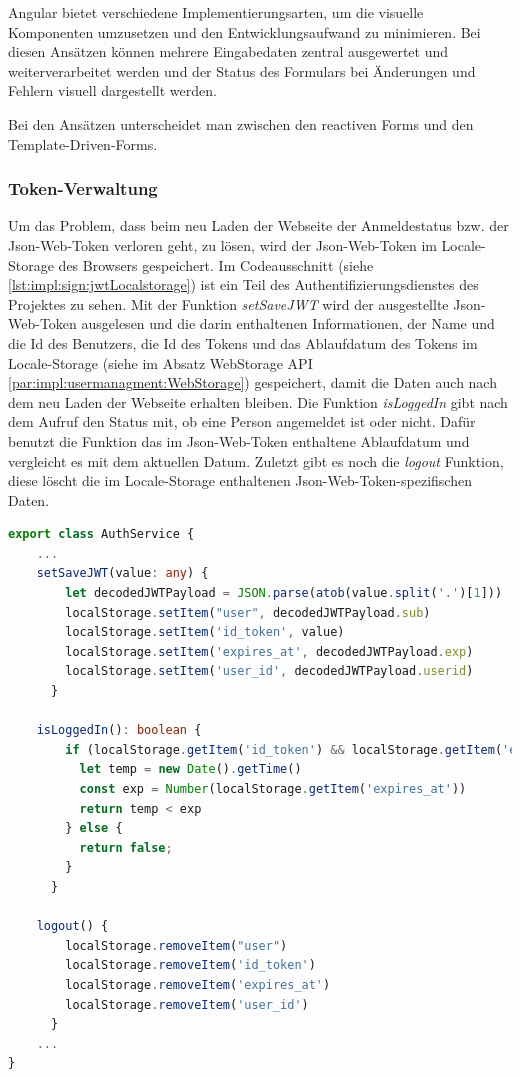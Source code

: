 Angular bietet verschiedene Implementierungsarten, um die visuelle Komponenten umzusetzen und den Entwicklungsaufwand zu minimieren. Bei diesen Ansätzen können mehrere Eingabedaten zentral ausgewertet und weiterverarbeitet werden und der Status des Formulars bei Änderungen und Fehlern visuell dargestellt werden. \cite[Bookmonkey - 12 Formularverarbeitung und
Validierung: Iteration IV]{AngularBuch}

Bei den Ansätzen unterscheidet man zwischen den reactiven Forms und den Template-Driven-Forms.

\subsubsection{Token-Verwaltung}
\label{sec:tokenveraltung}
Um das Problem, dass beim neu Laden der Webseite der Anmeldestatus bzw. der Json-Web-Token verloren geht, zu lösen, wird der Json-Web-Token im Locale-Storage des Browsers gespeichert. 
Im Codeausschnitt (siehe \ref{lst:impl:sign:jwtLocalstorage}) ist ein Teil des Authentifizierungsdienstes des Projektes zu sehen. Mit der Funktion \emph{setSaveJWT} wird der ausgestellte Json-Web-Token ausgelesen und die darin enthaltenen Informationen, der Name und die Id des Benutzers, die Id des Tokens und das Ablaufdatum des Tokens im Locale-Storage (siehe im Absatz WebStorage API \ref{par:impl:usermanagment:WebStorage}) gespeichert, damit die Daten auch nach dem neu Laden der Webseite erhalten bleiben. Die Funktion \emph{isLoggedIn} gibt nach dem Aufruf den Status mit, ob eine Person angemeldet ist oder nicht. Dafür benutzt die Funktion das im Json-Web-Token enthaltene Ablaufdatum und vergleicht es mit dem aktuellen Datum. Zuletzt gibt es noch die \emph{logout} Funktion, diese löscht die im Locale-Storage enthaltenen Json-Web-Token-spezifischen Daten.

\begin{lstlisting}[caption=auth.service.ts - Json-Web-Token und Localstorage,label=lst:impl:sign:jwtLocalstorage,language=TypeScript ]
export class AuthService {
    ...
    setSaveJWT(value: any) {
        let decodedJWTPayload = JSON.parse(atob(value.split('.')[1]))
        localStorage.setItem("user", decodedJWTPayload.sub)
        localStorage.setItem('id_token', value)
        localStorage.setItem('expires_at', decodedJWTPayload.exp)
        localStorage.setItem('user_id', decodedJWTPayload.userid)
      }

    isLoggedIn(): boolean {
        if (localStorage.getItem('id_token') && localStorage.getItem('expires_at')) {
          let temp = new Date().getTime()
          const exp = Number(localStorage.getItem('expires_at'))
          return temp < exp
        } else {
          return false;
        }
      }

    logout() {
        localStorage.removeItem("user")
        localStorage.removeItem('id_token')
        localStorage.removeItem('expires_at')
        localStorage.removeItem('user_id')
      }
    ...
}        
\end{lstlisting}

